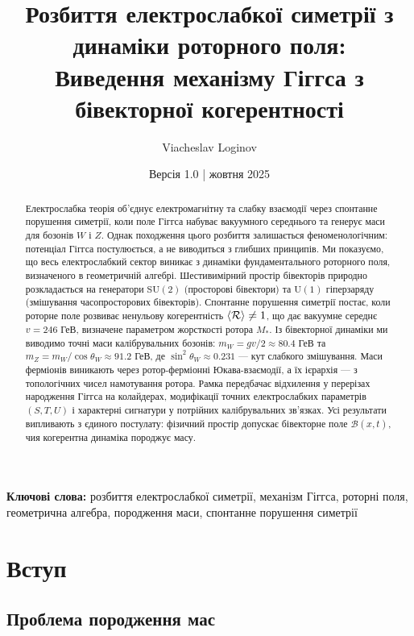 \documentclass[11pt,a4paper]{article}
\title{\textbf{Розбиття електрослабкої симетрії з динаміки роторного поля: \\
Виведення механізму Гіггса з бівекторної когерентності}}
\author[1]{Viacheslav Loginov}
\affil[1]{Kyiv, Ukraine\\ \texttt{barthez.slavik@gmail.com}}
\date{\small Версія 1.0 \quad|\quad 15 жовтня 2025}
\newcommand{\Rotor}{\mathcal{R}}
\newcommand{\Biv}{\mathcal{B}}
\newcommand{\SU}{\mathrm{SU}}
\newcommand{\UU}{\mathrm{U}}
\theoremstyle{definition}
\theoremstyle{plain}
\theoremstyle{remark}
\begin{document}
\maketitle

\begin{abstract}
\noindent
Електрослабка теорія об’єднує електромагнітну та слабку взаємодії через спонтанне порушення симетрії, коли поле Гіггса набуває вакуумного середнього та генерує маси для бозонів $W$ і $Z$. Однак походження цього розбиття залишається феноменологічним: потенціал Гіггса постулюється, а не виводиться з глибших принципів. Ми показуємо, що весь електрослабкий сектор виникає з динаміки фундаментального роторного поля, визначеного в геометричній алгебрі. Шестивимірний простір бівекторів природно розкладається на генератори $\SU(2)$ (просторові бівектори) та $\UU(1)$ гіперзаряду (змішування часопросторових бівекторів). Спонтанне порушення симетрії постає, коли роторне поле розвиває ненульову когерентність $\ev{\Rotor} \neq 1$, що дає вакуумне середнє $v = 246$ ГеВ, визначене параметром жорсткості ротора $M_\ast$. Із бівекторної динаміки ми виводимо точні маси калібрувальних бозонів: $m_W = gv/2 \approx 80{.}4$ ГеВ та $m_Z = m_W/\cos\theta_W \approx 91{.}2$ ГеВ, де $\sin^2\theta_W \approx 0{.}231$ — кут слабкого змішування. Маси ферміонів виникають через ротор-ферміонні Юкава-взаємодії, а їх ієрархія — з топологічних чисел намотування ротора. Рамка передбачає відхилення у перерізах народження Гіггса на колайдерах, модифікації точних електрослабких параметрів $(S,T,U)$ і характерні сигнатури у потрійних калібрувальних зв’язках. Усі результати випливають з єдиного постулату: фізичний простір допускає бівекторне поле $\Biv(x,t)$, чия когерентна динаміка породжує масу.
\end{abstract}

\noindent\textbf{Ключові слова:} розбиття електрослабкої симетрії, механізм Гіггса, роторні поля, геометрична алгебра, породження маси, спонтанне порушення симетрії

\vspace{1em}

\section{Вступ}

\subsection{Проблема породження мас}
\end{document}
